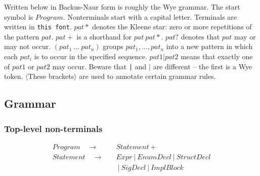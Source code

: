 \documentclass[a4paper, 12pt]{article}
\newcommand{\sepbar}{\: | \:}	%
\newcommand{\substo}{\quad\rightarrow\quad}
\renewcommand{\tt}{\texttt}
\newcommand{\la}{\langle}
\newcommand{\ra}{\rangle}
\begin{document}
Written below in Backus-Naur form is roughly the Wye grammar. The start symbol is
$Program$. Nonterminals start with a capital letter. Terminals are written in
\tt{this font}. $pat*$ denotes the Kleene star: zero or more repetitions of
the pattern $pat$. $pat+$ is a shorthand for $pat\: pat*$. $pat?$ denotes that
$pat$ may or may not occur. $( pat_1\:...\: pat_n )$ groups $pat_1, ..., pat_n$
into a new pattern in which each $pat_i$ is to occur in the specified sequence.
$pat1 | pat2$ means that exactly one of $pat1$ or $pat2$ may occur. Beware that
\tt{|} and $|$ are different -- the first is a Wye token. $\la$These
brackets$\ra$ are used to annotate certain grammar rules.

\subsection{Grammar}
\subsubsection{Top-level non-terminals}
\begin{align*}
Program \substo& Statement+\\
Statement \substo& Expr \sepbar EnumDecl \sepbar StructDecl\\
&\sepbar SigDecl \sepbar ImplBlock
\end{align*}
\end{document}
